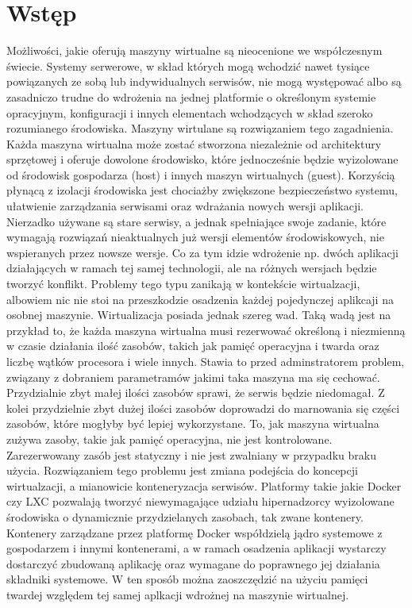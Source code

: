 \documentclass[polish, a4paper, 12pt, oneside]{book}
\begin{document}
\tableofcontents{}

\chapter{Wstęp}
Możliwości, jakie oferują maszyny wirtualne są nieocenione we współczesnym świecie. Systemy serwerowe, w skład których mogą wchodzić nawet tysiące powiązanych ze sobą lub indywidualnych serwisów, nie mogą występować albo są zasadniczo trudne do wdrożenia na jednej platformie o określonym systemie opracyjnym, konfiguracji i innych elementach wchodzących w skład szeroko rozumianego środowiska. Maszyny wirtulane są rozwiązaniem tego zagadnienia. Każda maszyna wirtualna może zostać stworzona niezależnie od architektury sprzętowej i oferuje dowolone środowisko, które jednocześnie będzie wyizolowane od środowisk gospodarza (host) i innych maszyn wirtualnych (guest). Korzyścią płynącą z izolacji środowiska jest chociażby zwiększone bezpieczeństwo systemu, ułatwienie zarządzania serwisami oraz wdrażania nowych wersji aplikacji. Nierzadko używane są stare serwisy, a jednak spełniające swoje zadanie, które wymagają rozwiązań nieaktualnych już wersji elementów środowiskowych, nie wspieranych przez nowsze wersje. Co za tym idzie wdrożenie np. dwóch aplikacji działających w ramach tej samej technologii, ale na różnych wersjach będzie tworzyć konflikt. Problemy tego typu zanikają w kontekście wirtualzacji, albowiem nic nie stoi na przeszkodzie osadzenia każdej pojedynczej aplikcaji na osobnej maszynie. Wirtualizacja posiada jednak szereg wad. Taką wadą jest na przykład to, że każda maszyna wirtualna musi rezerwować określoną i niezmienną w czasie działania ilość zasobów, takich jak pamięć operacyjna i twarda oraz liczbę wątków procesora i wiele innych. Stawia to przed adminstratorem problem, związany z dobraniem parametramów jakimi taka maszyna ma się cechować. Przydzialnie zbyt małej ilości zasobów sprawi, że serwis będzie niedomagał. Z kolei przydzielnie zbyt dużej ilości zasobów doprowadzi do marnowania się części zasobów, które mogłyby być lepiej wykorzystane. To, jak maszyna wirtualna zużywa zasoby, takie jak pamięć operacyjna, nie jest kontrolowane. Zarezerwowany zasób jest statyczny i nie jest zwalniany w przypadku braku użycia. Rozwiązaniem tego problemu jest zmiana podejścia do koncepcji wirtualzacji, a mianowicie konteneryzacja serwisów. Platformy takie jakie Docker czy LXC pozwalają tworzyć niewymagające udziału hipernadzorcy wyizolowane środowiska o dynamicznie przydzielanych zasobach, tak zwane kontenery. Kontenery zarządzane przez platformę Docker współdzielą jądro systemowe z gospodarzem i innymi kontenerami, a w ramach osadzenia aplikacji wystarczy dostarczyć zbudowaną aplikację oraz wymagane do poprawnego jej działania składniki systemowe. W ten sposób można zaoszczędzić na użyciu pamięci twardej względem tej samej aplkacji wdrożnej na maszynie wirtualnej. 
\end{document}
